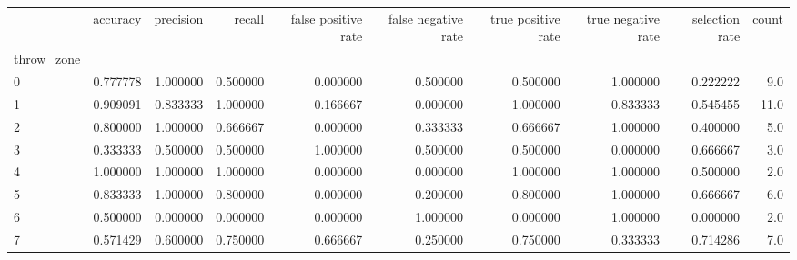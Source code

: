\begin{tabular}{lrrrrrrrrr}
\toprule
{} &  accuracy &  precision &    recall &  false positive rate &  false negative rate &  true positive rate &  true negative rate &  selection rate &  count \\
throw\_zone &           &            &           &                      &                      &                     &                     &                 &        \\
\midrule
0          &  0.777778 &   1.000000 &  0.500000 &             0.000000 &             0.500000 &            0.500000 &            1.000000 &        0.222222 &    9.0 \\
1          &  0.909091 &   0.833333 &  1.000000 &             0.166667 &             0.000000 &            1.000000 &            0.833333 &        0.545455 &   11.0 \\
2          &  0.800000 &   1.000000 &  0.666667 &             0.000000 &             0.333333 &            0.666667 &            1.000000 &        0.400000 &    5.0 \\
3          &  0.333333 &   0.500000 &  0.500000 &             1.000000 &             0.500000 &            0.500000 &            0.000000 &        0.666667 &    3.0 \\
4          &  1.000000 &   1.000000 &  1.000000 &             0.000000 &             0.000000 &            1.000000 &            1.000000 &        0.500000 &    2.0 \\
5          &  0.833333 &   1.000000 &  0.800000 &             0.000000 &             0.200000 &            0.800000 &            1.000000 &        0.666667 &    6.0 \\
6          &  0.500000 &   0.000000 &  0.000000 &             0.000000 &             1.000000 &            0.000000 &            1.000000 &        0.000000 &    2.0 \\
7          &  0.571429 &   0.600000 &  0.750000 &             0.666667 &             0.250000 &            0.750000 &            0.333333 &        0.714286 &    7.0 \\
\bottomrule
\end{tabular}

